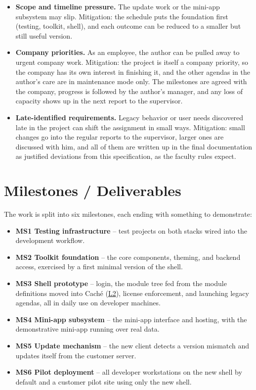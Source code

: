 \documentclass{article}
\newcommand{\req}[1]{\hyperlink{req:#1}{#1}}
\begin{document}
\begin{itemize}
  \item \textbf{Scope and timeline pressure.} The update work or the mini-app subsystem may slip. Mitigation: the schedule puts the foundation first (testing, toolkit, shell), and each outcome can be reduced to a smaller but still useful version.
  \item \textbf{Company priorities.} As an employee, the author can be pulled away to urgent company work. Mitigation: the project is itself a company priority, so the company has its own interest in finishing it, and the other agendas in the author's care are in maintenance mode only. The milestones are agreed with the company, progress is followed by the author's manager, and any loss of capacity shows up in the next report to the supervisor.
  \item \textbf{Late-identified requirements.} Legacy behavior or user needs discovered late in the project can shift the assignment in small ways. Mitigation: small changes go into the regular reports to the supervisor, larger ones are discussed with him, and all of them are written up in the final documentation as justified deviations from this specification, as the faculty rules expect.
\end{itemize}

\section{Milestones / Deliverables}
\label{sec:milestones}

The work is split into six milestones, each ending with something to demonstrate:

\begin{itemize}
  \item \textbf{MS1 Testing infrastructure} -- test projects on both stacks wired into the development workflow.
  \item \textbf{MS2 Toolkit foundation} -- the core components, theming, and backend access, exercised by a first minimal version of the shell.
  \item \textbf{MS3 Shell prototype} -- login, the module tree fed from the module definitions moved into Caché (\req{L2}), license enforcement, and launching legacy agendas, all in daily use on developer machines.
  \item \textbf{MS4 Mini-app subsystem} -- the mini-app interface and hosting, with the demonstrative mini-app running over real data.
  \item \textbf{MS5 Update mechanism} -- the new client detects a version mismatch and updates itself from the customer server.
  \item \textbf{MS6 Pilot deployment} -- all developer workstations on the new shell by default and a customer pilot site using only the new shell.
\end{itemize}
\end{document}
